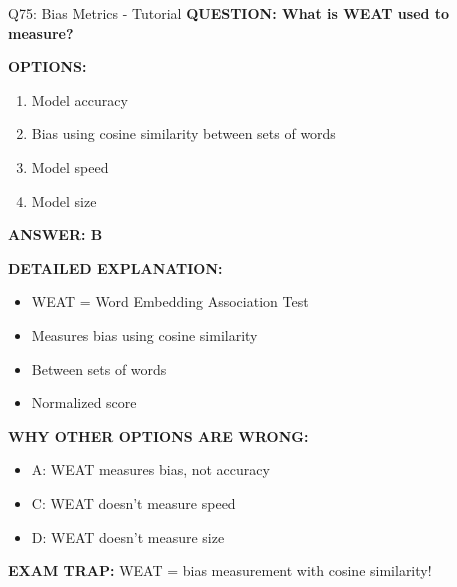 \documentclass[8pt]{beamer}
\begin{document}
	\begin{frame}{Q75: Bias Metrics - Tutorial}
		\fontsize{6.5}{7.5}\selectfont
		\textbf{QUESTION: What is WEAT used to measure?}
		
		\vspace{0.1cm}
		\textbf{OPTIONS:}
		\begin{enumerate}
			\item Model accuracy
			\item Bias using cosine similarity between sets of words
			\item Model speed
			\item Model size
		\end{enumerate}
		
		\vspace{0.1cm}
		\textcolor{myblue}{\textbf{ANSWER: B}}
		
		\vspace{0.1cm}
		\textbf{DETAILED EXPLANATION:}
		\begin{itemize}
			\item WEAT = Word Embedding Association Test
			\item Measures bias using cosine similarity
			\item Between sets of words
			\item Normalized score
		\end{itemize}
		
		\vspace{0.1cm}
		\textcolor{myred}{\textbf{WHY OTHER OPTIONS ARE WRONG:}}
		\begin{itemize}
			\item \textcolor{myred}{A:} WEAT measures bias, not accuracy
			\item \textcolor{myred}{C:} WEAT doesn't measure speed
			\item \textcolor{myred}{D:} WEAT doesn't measure size
		\end{itemize}
		
		\textcolor{myred}{\textbf{EXAM TRAP:}} WEAT = \textcolor{myblue}{bias measurement} with cosine similarity!
	\end{frame}
	
\end{document}
